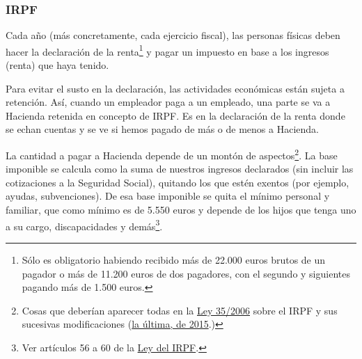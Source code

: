 \documentclass[nochap,palatino,shortheader]{apuntes}
\newcommand{\study}[1]{#1} \newcommand{\substudy}[1]{#1}
\begin{document}
\subsubsection{IRPF}

Cada año (más concretamente, cada ejercicio fiscal), las personas físicas deben hacer la declaración de la renta\footnote{Sólo es obligatorio habiendo recibido más de 22.000 euros brutos de un pagador o más de 11.200 euros de dos pagadores, con el segundo y siguientes pagando más de 1.500 euros.} y pagar un impuesto en base a los ingresos (renta) que haya tenido.

Para evitar el susto en la declaración, las actividades económicas están sujeta a retención. Así, cuando un empleador paga a un empleado, una parte se va a Hacienda retenida en concepto de IRPF\footnotemark.
Es en la declaración de la renta donde se echan cuentas y se ve si hemos pagado de más o de menos a Hacienda.


La cantidad a pagar a Hacienda depende de un montón de aspectos\footnote{Cosas que deberían aparecer todas en la \href{https://www.boe.es/buscar/act.php?id=BOE-A-2006-20764&tn=1&vd=&p=20151030}{Ley 35/2006} sobre el IRPF y sus sucesivas modificaciones (\href{http://www.boe.es/diario_boe/txt.php?id=BOE-A-2015-7765}{la última, de 2015}.)}.
La \study{base imponible} se calcula como la \substudy{suma de nuestros ingresos declarados (sin incluir las cotizaciones a la Seguridad Social), quitando los que estén exentos (por ejemplo, ayudas, subvenciones).} De esa base imponible se quita el \substudy{mínimo personal y familiar}, que como mínimo es de 5.550 euros y depende de los hijos que tenga uno a su cargo, discapacidades y demás\footnote{Ver artículos 56 a 60 de la \href{https://www.boe.es/buscar/act.php?id=BOE-A-2006-20764&b=29&tn=1&p=20141128}{Ley del IRPF}.}.
\end{document}
